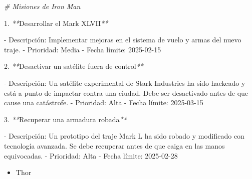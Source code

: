 \documentclass[
]{book}
\newenvironment{Shaded}{\begin{snugshade}}{\end{snugshade}}
\newcommand{\CommentTok}[1]{\textcolor[rgb]{0.56,0.35,0.01}{\textit{#1}}}
\newcommand{\ExtensionTok}[1]{#1}
\newcommand{\NormalTok}[1]{#1}
\newcommand{\PreprocessorTok}[1]{\textcolor[rgb]{0.56,0.35,0.01}{\textit{#1}}}
\providecommand{\tightlist}{%
  \setlength{\itemsep}{0pt}\setlength{\parskip}{0pt}}
\begin{document}
\begin{Shaded}
\begin{Highlighting}[]
\CommentTok{\# Misiones de Iron Man}

\ExtensionTok{1.} \PreprocessorTok{**}\NormalTok{Desarrollar el Mark XLVII}\PreprocessorTok{**}

   \ExtensionTok{{-}}\NormalTok{ Descripción: Implementar mejoras en el sistema de vuelo y armas del nuevo traje.}
   \ExtensionTok{{-}}\NormalTok{ Prioridad: Media}
   \ExtensionTok{{-}}\NormalTok{ Fecha límite: 2025{-}02{-}15}

\ExtensionTok{2.} \PreprocessorTok{**}\NormalTok{Desactivar un satélite fuera de control}\PreprocessorTok{**}

   \ExtensionTok{{-}}\NormalTok{ Descripción: Un satélite experimental de Stark Industries ha sido hackeado y está a punto de impactar contra una ciudad. Debe ser desactivado antes de que cause una catástrofe.}
   \ExtensionTok{{-}}\NormalTok{ Prioridad: Alta}
   \ExtensionTok{{-}}\NormalTok{ Fecha límite: 2025{-}03{-}15}

\ExtensionTok{3.} \PreprocessorTok{**}\NormalTok{Recuperar una armadura robada}\PreprocessorTok{**}

   \ExtensionTok{{-}}\NormalTok{ Descripción: Un prototipo del traje Mark L ha sido robado y modificado con tecnología avanzada. Se debe recuperar antes de que caiga en las manos equivocadas.}
   \ExtensionTok{{-}}\NormalTok{ Prioridad: Alta}
   \ExtensionTok{{-}}\NormalTok{ Fecha límite: 2025{-}02{-}28}
\end{Highlighting}
\end{Shaded}

\begin{itemize}
\tightlist
\item
  Thor
\end{itemize}
\end{document}
